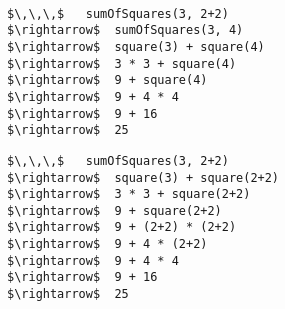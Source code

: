 

\example\ 
 
\begin{lstlisting}
$\,\,\,$   sumOfSquares(3, 2+2)
$\rightarrow$  sumOfSquares(3, 4)
$\rightarrow$  square(3) + square(4)
$\rightarrow$  3 * 3 + square(4)
$\rightarrow$  9 + square(4)
$\rightarrow$  9 + 4 * 4
$\rightarrow$  9 + 16
$\rightarrow$  25
\end{lstlisting}

\begin{lstlisting}
$\,\,\,$   sumOfSquares(3, 2+2)
$\rightarrow$  square(3) + square(2+2)
$\rightarrow$  3 * 3 + square(2+2)
$\rightarrow$  9 + square(2+2)
$\rightarrow$  9 + (2+2) * (2+2)
$\rightarrow$  9 + 4 * (2+2)
$\rightarrow$  9 + 4 * 4
$\rightarrow$  9 + 16
$\rightarrow$  25
\end{lstlisting}



